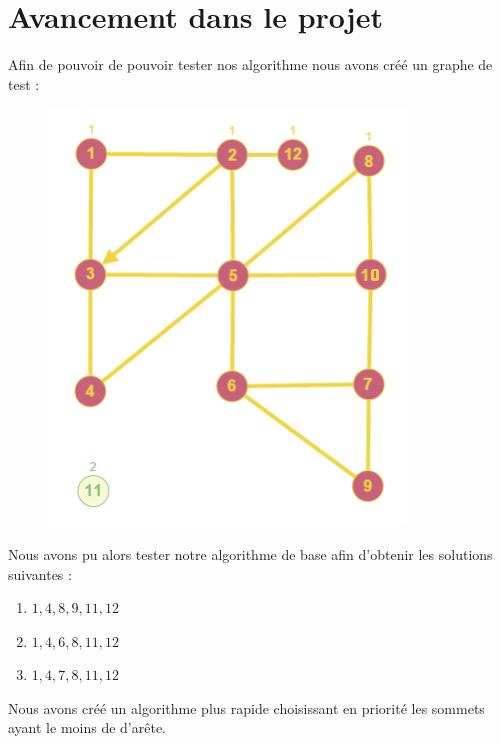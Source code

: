 \documentclass[10pt,a4paper]{article}
\begin{document}
\section{Avancement dans le projet}

Afin de pouvoir de pouvoir tester nos algorithme nous avons créé un graphe de test :

\begin{figure}[h]
 \hspace{-4cm}
\includegraphics[scale=1]{exemplegraphe.png}
\end{figure} 

Nous avons pu alors tester notre algorithme de base afin d'obtenir les solutions suivantes :

\begin{enumerate}
\item ${1, 4, 8, 9, 11, 12}$
\item ${1, 4, 6, 8, 11, 12 }$
\item ${1, 4, 7, 8, 11, 12 }$
\end{enumerate}

Nous avons créé un algorithme plus rapide choisissant en priorité les sommets ayant le moins de d'arête.
\end{document}
